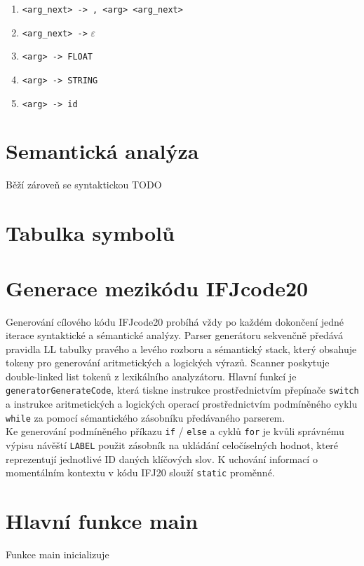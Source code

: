\documentclass[a4paper, 12pt]{article}
\begin{document}
\begin{enumerate}[noitemsep]
            \item \verb|<arg_next> -> , <arg> <arg_next>|
            \item \verb|<arg_next> ->| $\varepsilon$
            \item \verb|<arg> -> FLOAT|
            \item \verb|<arg> -> STRING|
            \item \verb|<arg> -> id| 
            
            
            
        \end{enumerate} 
\newpage

\section{Semantická analýza}
Běží zároveň se syntaktickou TODO

\newpage

\section{Tabulka symbolů}

\newpage

\section{Generace mezikódu IFJcode20}
Generování cílového kódu IFJcode20 probíhá vždy po každém dokončení jedné iterace syntaktické a sémantické analýzy. Parser generátoru sekvenčně předává pravidla LL tabulky pravého a levého rozboru a sémantický stack, který obsahuje tokeny pro generování aritmetických a logických výrazů. Scanner poskytuje double-linked list tokenů z lexikálního analyzátoru.
\newline
\newline
Hlavní funkcí je \verb|generatorGenerateCode|, která tiskne instrukce prostřednictvím přepínače \verb|switch| a instrukce aritmetických a logických operací prostřednictvím podmíněného cyklu \verb|while| za pomocí sémantického zásobníku předávaného parserem.\\
\newline
Ke generování podmíněného příkazu \verb|if| / \verb|else| a cyklů \verb|for| je kvůli správnému výpisu návěští \verb|LABEL| použit zásobník na ukládání celočíselných hodnot, které reprezentují jednotlivé ID daných klíčových slov. K uchování informací o momentálním kontextu v kódu IFJ20 slouží \verb|static| proměnné.\\
\newline

\newpage

\section{Hlavní funkce main}
Funkce main inicializuje
\end{document}
